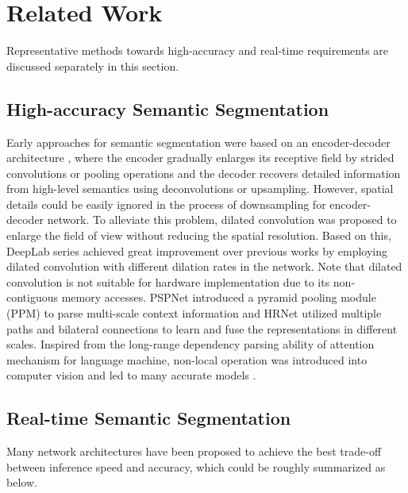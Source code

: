 \documentclass[10pt,twocolumn,letterpaper]{article}
\begin{document}
\section{Related Work}
\label{sec:related}
Representative methods towards high-accuracy and real-time requirements are discussed separately in this section.

\subsection{High-accuracy Semantic Segmentation}
Early approaches for semantic segmentation were based on an encoder-decoder architecture \cite{fcn, unet, segnet}, where the encoder gradually enlarges its receptive field by strided convolutions or pooling operations and the decoder recovers detailed information from high-level semantics using deconvolutions or upsampling. 
However, spatial details could be easily ignored in the process of downsampling for encoder-decoder network. To alleviate this problem, dilated convolution \cite{dilated} was proposed to enlarge the field of view without reducing the spatial resolution. Based on this, DeepLab series \cite{deeplabv2,deeplabv3,deeplabv3+} achieved great improvement over previous works by employing dilated convolution with different dilation rates in the network. Note that dilated convolution is not suitable for hardware implementation due to its non-contiguous memory accesses. 
PSPNet \cite{pspnet} introduced a pyramid pooling module (PPM) to parse multi-scale context information and HRNet \cite{hrnet} utilized multiple paths and bilateral connections to learn and fuse the representations in different scales. Inspired from the long-range dependency parsing ability of attention mechanism \cite{attention} for language machine, non-local operation \cite{nonlocal} was introduced into computer vision and led to many accurate models \cite{danet, ccnet, ocr}. 

\subsection{Real-time Semantic Segmentation}
Many network architectures have been proposed to achieve the best trade-off between inference speed and accuracy, which could be roughly summarized as below. 
\end{document}
